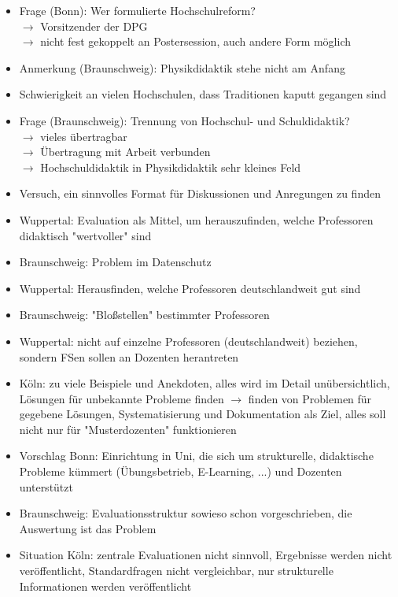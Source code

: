       \begin{itemize}
        \item Frage (Bonn): Wer formulierte Hochschulreform?\\
          $ \rightarrow $ Vorsitzender der DPG\\
           $ \rightarrow $ nicht fest gekoppelt an Postersession, auch andere Form möglich
        \item Anmerkung (Braunschweig): Physikdidaktik stehe nicht am Anfang
        \item Schwierigkeit an vielen Hochschulen, dass Traditionen kaputt gegangen sind
        \item Frage (Braunschweig): Trennung von Hochschul- und Schuldidaktik?\\
            $\rightarrow $ vieles übertragbar\\
            $ \rightarrow $ Übertragung mit Arbeit verbunden\\
            $ \rightarrow $ Hochschuldidaktik in Physikdidaktik sehr kleines Feld
        \item Versuch, ein sinnvolles Format für Diskussionen und Anregungen zu finden
        \item Wuppertal: Evaluation als Mittel, um herauszufinden, welche Professoren didaktisch "wertvoller" sind
        \item Braunschweig: Problem im Datenschutz
        \item Wuppertal: Herausfinden, welche Professoren deutschlandweit gut sind
        \item Braunschweig: "Bloßstellen" bestimmter Professoren
        \item Wuppertal: nicht auf einzelne Professoren (deutschlandweit) beziehen, sondern FSen sollen an Dozenten herantreten
        \item Köln: zu viele Beispiele und Anekdoten, alles wird im Detail unübersichtlich, Lösungen für unbekannte Probleme finden $\rightarrow$ finden von Problemen für gegebene Lösungen, Systematisierung und Dokumentation als Ziel, alles soll nicht nur für "Musterdozenten" funktionieren
        \item Vorschlag Bonn: Einrichtung in Uni, die sich um strukturelle, didaktische Probleme kümmert (Übungsbetrieb, E-Learning, ...) und Dozenten unterstützt
        \item Braunschweig: Evaluationsstruktur sowieso schon vorgeschrieben, die Auswertung ist das Problem
        \item Situation Köln: zentrale Evaluationen nicht sinnvoll, Ergebnisse werden nicht veröffentlicht, Standardfragen nicht vergleichbar, nur strukturelle Informationen werden veröffentlicht

\end{itemize}
